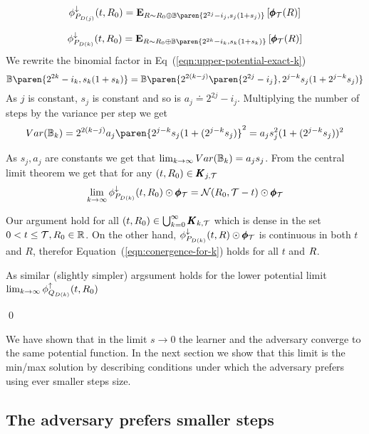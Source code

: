 \documentclass{article}[12pt]
\begin{document}
\begin{equation} \label{eqn:upper-potential-exact-j}
  \upperpotMdj(t,\R_0) =  \E{\R \sim \R_0 \oplus
    \Binom\paren{2^{2j}-i_j,s_j(1+s_j)}}{\finalPotR(\R)}
\end{equation}

\begin{equation} \label{eqn:upper-potential-exact-k}
  \upperpotMdk(t,\R_0) =  \E{\R \sim \R_0 \oplus
    \Binom\paren{2^{2k}-i_k,s_k(1+s_k)}}{\finalPotR(\R)}
\end{equation}
We rewrite the binomial factor in
Eq~(\ref{eqn:upper-potential-exact-k})
$$
 \Binom\paren{2^{2k}-i_k,s_k(1+s_k)} =
 \Binom\paren{2^{2(k-j)}\paren{2^{2j}-i_j},2^{j-k} s_j(1+2^{j-k} s_j)}
 $$
As $j$ is constant, $s_j$ is constant and so is $a_j \doteq
2^{2j}-i_j$. Multiplying the number of steps by the variance per step
we get
$$Var(\Binom_k) = 2^{2(k-j)}a_j\paren{2^{j-k} s_j(1+(2^{j-k} s_j)}^2
= a_j s_j^2 (1+(2^{j-k} s_j))^2 
$$

As $s_j,a_j$ are constants we get that $\lim_{k \to \infty}
Var(\mathbb{B}_k) = a_j s_j$.  From the central limit theorem we get that
for any $(t,R_0) \in \pmb{K}_{j,\mathcal{T}}$
\begin{equation} \label{eqn:conergence-for-k}
  \lim_{k \to \infty} \phi_{P_{D(k)}}^{\downarrow}(t,R_0) \odot \pmb{\phi}_{\mathcal{T}} = {\cal
    N}(R_0,\mathcal{T}-t) \odot \pmb{\phi}_{\mathcal{T}}
\end{equation}

Our argument hold for all $(t,R_0) \in \bigcup_{k=0}^\infty \pmb{K}_{k,\mathcal{T}}$ which is dense in the set $0<t\leq \mathcal{T}, R_0 \in \mathbb{R}$.
On the other hand, $\phi_{P_{D(k)}}^{\downarrow}(t,R) \odot \pmb{\phi}_{\mathcal{T}}$ is continuous in both
$t$ and $R$, therefor Equation~(\ref{eqn:conergence-for-k})  holds for all $t$ and $R$.

As similar (slightly simpler) argsument holds for the lower potential limit
$\lim_{k \to \infty} \phi_{Q_{D(k)}}^{\uparrow}(t,R_0)$

\qed

We have shown that in the limit $s \to 0$ the learner and the
adversary converge to the same potential function. In the next section
we show that this limit is the min/max solution by describing conditions
under which the adversary prefers using ever smaller steps size.

\subsection{The adversary prefers smaller steps} \label{sec:smallsteps}
\end{document}
